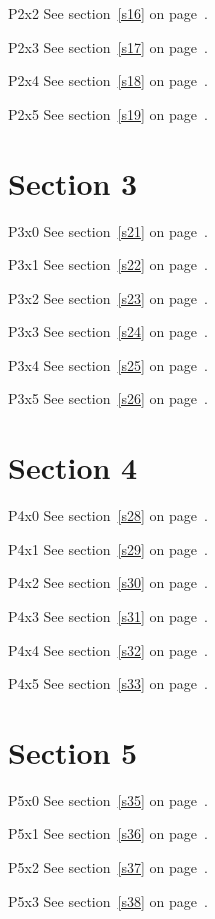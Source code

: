 P2x2 \w\w\w\w\w\w See section~\ref{s16} on page~\pageref{s8}.

P2x3 \w\w\w\w\w\w See section~\ref{s17} on page~\pageref{s9}.

P2x4 \w\w\w\w\w\w See section~\ref{s18} on page~\pageref{s10}.

P2x5 \w\w\w\w\w\w See section~\ref{s19} on page~\pageref{s11}.

\section{Section 3}\label{s3}
P3x0 \w\w\w\w\w\w See section~\ref{s21} on page~\pageref{s9}.

P3x1 \w\w\w\w\w\w See section~\ref{s22} on page~\pageref{s10}.

P3x2 \w\w\w\w\w\w See section~\ref{s23} on page~\pageref{s11}.

P3x3 \w\w\w\w\w\w See section~\ref{s24} on page~\pageref{s12}.

P3x4 \w\w\w\w\w\w See section~\ref{s25} on page~\pageref{s13}.

P3x5 \w\w\w\w\w\w See section~\ref{s26} on page~\pageref{s14}.

\section{Section 4}\label{s4}
P4x0 \w\w\w\w\w\w See section~\ref{s28} on page~\pageref{s12}.

P4x1 \w\w\w\w\w\w See section~\ref{s29} on page~\pageref{s13}.

P4x2 \w\w\w\w\w\w See section~\ref{s30} on page~\pageref{s14}.

P4x3 \w\w\w\w\w\w See section~\ref{s31} on page~\pageref{s15}.

P4x4 \w\w\w\w\w\w See section~\ref{s32} on page~\pageref{s16}.

P4x5 \w\w\w\w\w\w See section~\ref{s33} on page~\pageref{s17}.

\section{Section 5}\label{s5}
P5x0 \w\w\w\w\w\w See section~\ref{s35} on page~\pageref{s15}.

P5x1 \w\w\w\w\w\w See section~\ref{s36} on page~\pageref{s16}.

P5x2 \w\w\w\w\w\w See section~\ref{s37} on page~\pageref{s17}.

P5x3 \w\w\w\w\w\w See section~\ref{s38} on page~\pageref{s18}.

